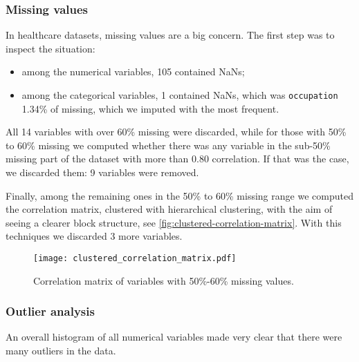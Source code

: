 \subsubsection{Missing values}

In healthcare datasets, missing values are a big concern. The first step was to inspect the situation:
\begin{itemize}
    \item among the numerical variables, 105 contained NaNs;
    \item among the categorical variables, 1 contained NaNs, which was \texttt{occupation} 1.34\% of missing, which we imputed with the most frequent.
\end{itemize}



All 14 variables with over 60\% missing were discarded, while for those with 50\% to 60\% missing we computed whether there was any variable in the sub-50\% missing part of the dataset with more than 0.80 correlation. If that was the case, we discarded them: 9 variables were removed.

Finally, among the remaining ones in the 50\% to 60\% missing range we computed the correlation matrix, clustered with hierarchical clustering, with the aim of seeing a clearer block structure, see \autoref{fig:clustered-correlation-matrix}. With this techniques we discarded 3 more variables.

\begin{figure}[htpb]
    \centering
    \texttt{[image: clustered\_correlation\_matrix.pdf]}
    \caption{Correlation matrix of variables with 50\%-60\% missing values.}
    \label{fig:clustered-correlation-matrix}
\end{figure}

\subsubsection{Outlier analysis}\label{sec:outlier-analysis}

An overall histogram of all numerical variables made very clear that there were many outliers in the data.


